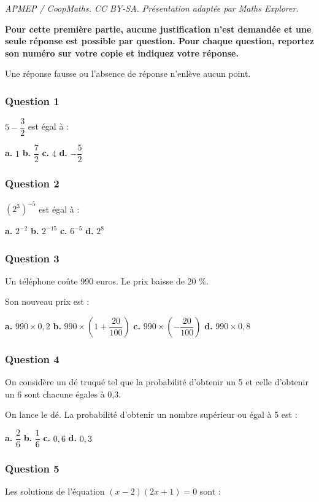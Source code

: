 \documentclass[10pt]{article}
\begin{document}
\noindent\textit{APMEP / CoopMaths. CC BY-SA. Présentation adaptée par Maths Explorer.}\par\medskip
\textbf{Pour cette première partie, aucune justification n'est demandée et une seule réponse est possible par question. Pour chaque question, reportez son numéro sur votre copie et indiquez votre réponse.}

Une réponse fausse ou l'absence de réponse n'enlève aucun point.

\subsubsection*{Question 1}
$5-\dfrac{3}{2}$ est égal à :

\textbf{a.} $1$ \hfill \textbf{b.} $\dfrac{7}{2}$ \hfill \textbf{c.} $4$ \hfill \textbf{d.} $-\dfrac{5}{2}$

\subsubsection*{Question 2}
$\left(2^3\right)^{-5}$ est égal à :

\textbf{a.} $2^{-2}$ \hfill \textbf{b.} $2^{-15}$ \hfill \textbf{c.} $6^{-5}$ \hfill \textbf{d.} $2^8$

\subsubsection*{Question 3}
Un téléphone coûte 990 euros. Le prix baisse de 20 \%.

Son nouveau prix est :

\textbf{a.} $990\times 0{,}2$ \hfill \textbf{b.} $990\times\left(1+\dfrac{20}{100}\right)$ \hfill \textbf{c.} $990\times\left(-\dfrac{20}{100}\right)$ \hfill \textbf{d.} $990\times 0{,}8$

\subsubsection*{Question 4}
On considère un dé truqué tel que la probabilité d'obtenir un 5 et celle d'obtenir un 6 sont chacune égales à 0,3.

On lance le dé. La probabilité d'obtenir un nombre supérieur ou égal à 5 est :

\textbf{a.} $\dfrac{2}{6}$ \hfill \textbf{b.} $\dfrac{1}{6}$ \hfill \textbf{c.} $0{,}6$ \hfill \textbf{d.} $0{,}3$

\subsubsection*{Question 5}
Les solutions de l'équation $(x-2)(2x+1)=0$ sont :
\end{document}
